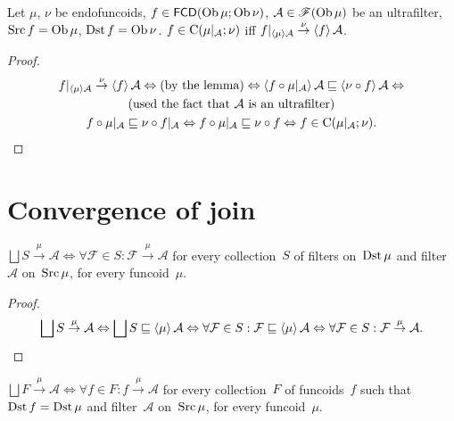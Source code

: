 \begin{thm}
Let $\mu$, $\nu$ be endofuncoids, $f\in\mathsf{FCD}(\operatorname{Ob}\mu;\operatorname{Ob}\nu)$,
$\mathcal{A}\in\mathscr{F}(\operatorname{Ob}\mu)$ be an ultrafilter, $\operatorname{Src} f=\operatorname{Ob}\mu$,
$\operatorname{Dst} f=\operatorname{Ob}\nu$. $f\in\mathrm{C}(\mu|_{\mathcal{A}};\nu)$ iff $f|_{\left\langle \mu\right\rangle\mathcal{A}}\overset{\nu}{\rightarrow}\left\langle f\right\rangle\mathcal{A}$.\end{thm}
\begin{proof}
~
\begin{multline*}
f|_{\left\langle \mu\right\rangle\mathcal{A}}\overset{\nu}{\rightarrow}\left\langle f\right\rangle\mathcal{A}\Leftrightarrow\text{(by the lemma)}\Leftrightarrow\left\langle f\circ\mu|_{\mathcal{A}}\right\rangle\mathcal{A}\sqsubseteq\left\langle \nu\circ f\right\rangle\mathcal{A}\Leftrightarrow\\
\text{(used the fact that \ensuremath{\mathcal{A}} is an ultrafilter)}\\
f\circ\mu|_{\mathcal{A}}\sqsubseteq\nu\circ f|_{\mathcal{A}}\Leftrightarrow f\circ\mu|_{\mathcal{A}}\sqsubseteq\nu\circ f\Leftrightarrow f\in\mathrm{C}(\mu|_{\mathcal{A}};\nu).
\end{multline*}

\end{proof}

\section{Convergence of join}

\begin{prop}
$\bigsqcup S\overset{\mu}{\rightarrow}\mathcal{A} \Leftrightarrow \forall\mathcal{F}\in S:\mathcal{F}\overset{\mu}{\rightarrow}\mathcal{A}$
for every collection~$S$ of filters on~$\operatorname{Dst}\mu$ and filter~$\mathcal{A}$ on~$\operatorname{Src}\mu$, for every funcoid~$\mu$.
\end{prop}

\begin{proof}
~
\[\bigsqcup S\overset{\mu}{\rightarrow}\mathcal{A} \Leftrightarrow \bigsqcup S\sqsubseteq\supfun{\mu}\mathcal{A} \Leftrightarrow
\forall\mathcal{F}\in S:\mathcal{F}\sqsubseteq\supfun{\mu}\mathcal{A} \Leftrightarrow \forall\mathcal{F}\in S:\mathcal{F}\overset{\mu}{\rightarrow}\mathcal{A}.\]
\end{proof}

\begin{cor}
$\bigsqcup F\overset{\mu}{\rightarrow}\mathcal{A} \Leftrightarrow \forall f\in F:f\overset{\mu}{\rightarrow}\mathcal{A}$
for every collection~$F$ of funcoids~$f$ such that $\operatorname{Dst} f=\operatorname{Dst}\mu$ and filter~$\mathcal{A}$ on~$\operatorname{Src}\mu$, for every funcoid~$\mu$.
\end{cor}

